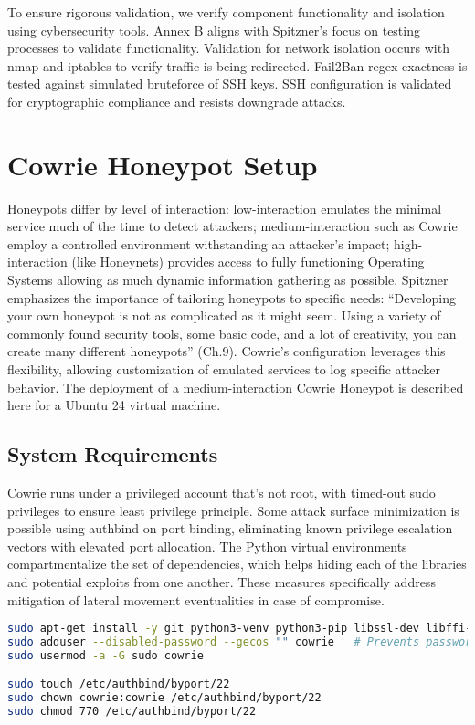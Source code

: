 \documentclass{cls/ULBreport}
\begin{document}
        To ensure rigorous validation, we verify component functionality and isolation using cybersecurity tools. \hyperref[annexes:network]{Annex B} aligns with Spitzner's focus on testing processes to validate functionality. Validation for network isolation occurs with nmap and iptables to verify traffic is being redirected. Fail2Ban regex exactness is tested against simulated bruteforce of SSH keys. SSH configuration is validated for cryptographic compliance and resists downgrade attacks.
        


    \section{Cowrie Honeypot Setup}
    Honeypots differ by level of interaction: low-interaction emulates the minimal service much of the time to detect attackers; medium-interaction such as Cowrie employ a controlled environment withstanding an attacker's impact; high-interaction (like Honeynets) provides access to fully functioning Operating Systems allowing as much dynamic information gathering as possible.
    Spitzner emphasizes the importance of tailoring honeypots to specific needs: \enquote{Developing your own honeypot is not as complicated as it might seem. Using a variety of commonly found security tools, some basic code, and a lot of creativity, you can create many different honeypots} (Ch.9). Cowrie’s configuration leverages this flexibility, allowing customization of emulated services to log specific attacker behavior. The deployment of a medium-interaction Cowrie Honeypot is described here for a Ubuntu 24 virtual machine.
    
\label{sec:cowrie}
    \subsection{System Requirements}
    Cowrie runs under a privileged account that's not root, with timed-out sudo privileges to ensure least privilege principle. Some attack surface minimization is possible using authbind on port binding, eliminating known privilege escalation vectors with elevated port allocation. The Python virtual environments compartmentalize the set of dependencies, which helps hiding each of the libraries and potential exploits from one another. These measures specifically address mitigation of lateral movement eventualities in case of compromise. 
    
    \begin{lstlisting}[language=bash,caption={Cowrie User Creation}]
sudo apt-get install -y git python3-venv python3-pip libssl-dev libffi-dev build-essential libpython3-dev authbind
sudo adduser --disabled-password --gecos "" cowrie   # Prevents password-based connections 
sudo usermod -a -G sudo cowrie

sudo touch /etc/authbind/byport/22
sudo chown cowrie:cowrie /etc/authbind/byport/22
sudo chmod 770 /etc/authbind/byport/22
    \end{lstlisting}
\end{document}
